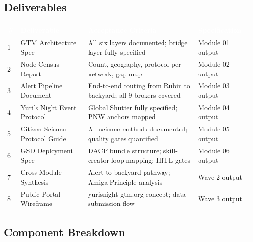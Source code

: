 \documentclass[11pt,letterpaper]{article}
\newcommand{\tableheader}[1]{\textbf{\sffamily\textcolor{white}{#1}}}
\begin{document}
\subsection{Deliverables}

\begin{center}
\begin{tabularx}{\textwidth}{C{0.5cm}L{3.5cm}L{3.5cm}X}
\toprule
{}
\tableheader{\#} & \tableheader{Deliverable} & \tableheader{Acceptance Criteria} & \tableheader{Specification} \\
 & GTM Architecture Spec & All six layers documented; bridge layer fully specified & Module 01 output \\
2 & Node Census Report & Count, geography, protocol per network; gap map & Module 02 output \\
3 & Alert Pipeline Document & End-to-end routing from Rubin to backyard; all 9 brokers covered & Module 03 output \\
4 & Yuri's Night Event Protocol & Global Shutter fully specified; PNW anchors mapped & Module 04 output \\
5 & Citizen Science Protocol Guide & All science methods documented; quality gates quantified & Module 05 output \\
6 & GSD Deployment Spec & DACP bundle structure; skill-creator loop mapping; HITL gates & Module 06 output \\
7 & Cross-Module Synthesis & Alert-to-backyard pathway; Amiga Principle analysis & Wave 2 output \\
8 & Public Portal Wireframe & yurisnight-gtm.org concept; data submission flow & Wave 3 output \\
\bottomrule
\end{tabularx}
\end{center}

\subsection{Component Breakdown}
\end{document}
